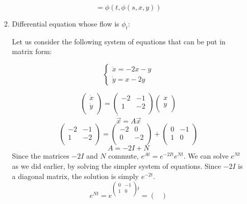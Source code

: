 \documentclass[12pt,letterpaper,reqno]{amsart}
\begin{document}
\begin{enumerate}
\begin{enumerate}
$$= \phi(t,\phi(s,x,y))$$    
\newpage
    \item Differential equation whose flow is $\phi_t$:\newline
    \begin{flushleft}
    Let us consider the following system of equations that can be put in matrix form:\newline
    \end{flushleft}
    \[
    \left\{
                \begin{array}{ll}
                  \dot{x} = -2x-y\\
                  \dot{y} = x-2y
                \end{array}
              \right.
  \]
  \begin{flushleft}
  $$\begin{pmatrix}
  \dot{x} \\
  \dot{y} \\
\end{pmatrix} =
\begin{pmatrix}
  -2 & -1 \\
  1 & -2 \\
\end{pmatrix}
\begin{pmatrix}
  x \\
  y \\
\end{pmatrix}$$
  $$\dot{\vec{x}} = A\vec{x}$$
  $$\begin{pmatrix}
  -2 & -1 \\
  1 & -2 \\
\end{pmatrix} = \begin{pmatrix}
  -2 & 0 \\
  0 & -2 \\
\end{pmatrix} + \begin{pmatrix}
  0 & -1 \\
  1 & 0 \\
\end{pmatrix}$$
$$A = -2I + N$$
Since the matrices $-2I$ and $N$ commute, $e^{At} = e^{-2It}e^{Nt}$. We can solve $e^{Nt}$ as we did earlier, by solving the simpler system of equations. Since $-2I$ is a diagonal matrix, the solution is simply $e^{-2t}$.
$$e^{Nt} = e^{\begin{pmatrix}
  0 & -1 \\
  1 & 0 \\
\end{pmatrix}t} = \begin{pmatrix}

\end{pmatrix}$$
\end{flushleft}
\end{enumerate}
\end{enumerate}
\end{document}
